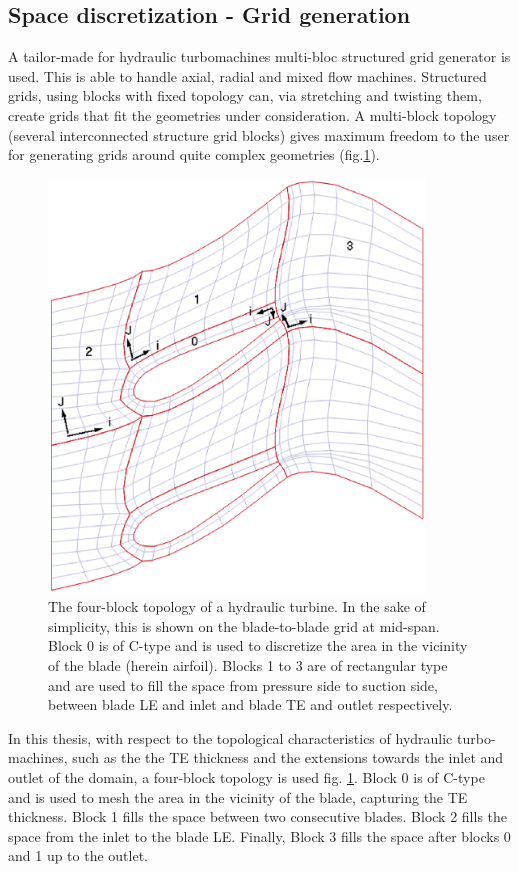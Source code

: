 \subsection{Space discretization - Grid generation}
\label{SpaceDisct}
A tailor-made for hydraulic turbomachines multi-bloc structured grid generator is used. This is able to handle axial, radial and mixed flow machines. Structured grids, using blocks with fixed topology can, via stretching and twisting them, create grids that fit the geometries under consideration. A multi-block topology (several interconnected structure grid blocks) gives maximum freedom to the user for generating grids around quite complex geometries (fig.\ref{grid1}). 


\begin{figure}[h!]
\centering
\includegraphics[width=100mm]{cGridSkBlockIndex.eps} 
\caption{The four-block topology of a hydraulic turbine. In the sake of simplicity, this is shown on the blade-to-blade grid at mid-span. Block 0 is of C-type and is used to discretize the area in the vicinity of the blade (herein airfoil). Blocks 1 to 3 are of rectangular type and are used to fill the space from pressure side to suction side, between blade LE and inlet and  blade TE and outlet respectively. }
\label{grid1}
\end{figure}


In this thesis, with respect to the topological characteristics of hydraulic turbo-machines, such as the the TE thickness and the extensions towards the inlet and outlet of the domain, a four-block topology is used  fig. \ref{grid1}. Block 0 is of C-type and is used to mesh the area in the vicinity of the blade, capturing the TE thickness. Block 1 fills the space between two consecutive blades. Block 2 fills the space from the inlet to the blade LE. Finally, Block 3 fills the space after blocks 0 and 1 up to the outlet. 

